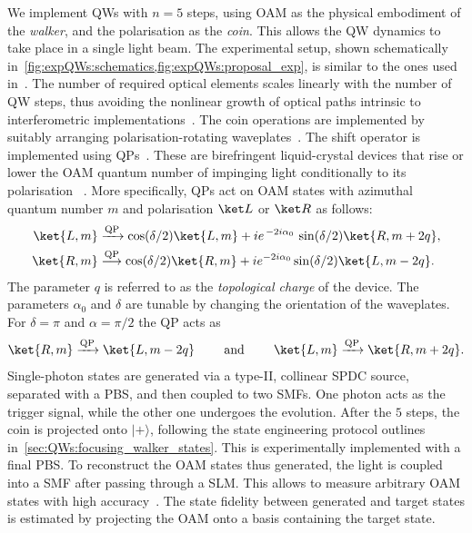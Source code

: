 We implement \acp{QW} with $n=5$ steps, using \ac{OAM} as the physical embodiment of the \emph{walker}, and the polarisation as the \emph{coin}. This allows the QW dynamics to take place in a single light beam.
The experimental setup, shown schematically in~\cref{fig:expQWs:schematics,fig:expQWs:proposal_exp}, is similar to the ones used in~\cite{cardano2015quantum,cardano2016statistical}.
The number of required optical elements scales linearly with the number of QW steps, thus avoiding the nonlinear growth of optical paths intrinsic to interferometric implementations~\cite{zhang2010implementation,goyal2013implementing}.
The coin operations are implemented by suitably arranging polarisation-rotating waveplates~\cite{simon1990minimal}. The shift operator is implemented using \acp{QP}~\cite{marrucci2006optical}. These are birefringent liquid-crystal devices that rise or lower the \ac{OAM} quantum number of impinging light conditionally to its polarisation ~\cite{marrucci2006optical}. More specifically, \acp{QP} act on \ac{OAM} states with azimuthal quantum number $m$ and polarisation $\ket L$ or $\ket R$ as follows:
\begin{equation}
\begin{aligned}
	\ket{L,m} & \xrightarrow{\text{QP}} \cos(\delta/2) \ket{L,m}
				+ i e^{\,-2 i \alpha_0}\, \sin(\delta/2) \ket{R,m+2q}, \\
	\ket{R,m} & \stackrel{\text{QP}}{\longrightarrow} \cos(\delta/2) \ket{R,m}
				+ i e^{-2 i \alpha_0} \sin(\delta/2) \ket{L,m-2q}.
\end{aligned}
\end{equation}
The parameter $q$ is referred to as the \emph{topological charge} of the device.
The parameters $\alpha_0$ and $\delta$ are tunable by changing the orientation of the waveplates. For $\delta=\pi$ and $\alpha=\pi/2$ the QP acts as
\begin{equation}
	\ket{R,m}\xrightarrow{\text{QP}} \ket{L,m-2q}
	\qquad\text{ and }\qquad
	\ket{L,m}\xrightarrow{\text{QP}}\ket{R,m+2q}.
\end{equation}
Single-photon states are generated via a type-II, collinear \ac{SPDC} source, separated with a \ac{PBS}, and then coupled to two \acp{SMF}. One photon acts as the trigger signal, while the other one undergoes the evolution.
After the $5$ steps, the coin is projected onto $|+\rangle$, following the state engineering protocol outlines in~\cref{sec:QWs:focusing_walker_states}. This is experimentally implemented with a final \ac{PBS}.
To reconstruct the \ac{OAM} states thus generated, the light is coupled into a \ac{SMF} after passing through a \ac{SLM}. This allows to measure arbitrary \ac{OAM} states with high accuracy~\cite{bolduc2013exact,dambrosio2013test}.
The state fidelity between generated and target states is estimated by projecting the \ac{OAM} onto a basis containing the target state.


